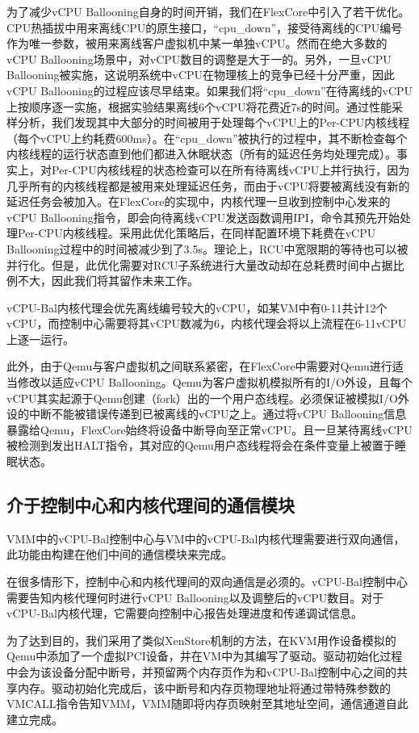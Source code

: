 为了减少vCPU Ballooning自身的时间开销，我们在FlexCore中引入了若干优化。CPU热插拔中用来离线CPU的原生接口，``cpu\_down''，接受待离线的CPU编号作为唯一参数，被用来离线客户虚拟机中某一单独vCPU。然而在绝大多数的vCPU Ballooning场景中，对vCPU数目的调整是大于一的。另外，一旦vCPU Ballooning被实施，这说明系统中vCPU在物理核上的竞争已经十分严重，因此vCPU Ballooning的过程应该尽早结束。如果我们将``cpu\_down''在待离线的vCPU上按顺序逐一实施，根据实验结果离线6个vCPU将花费近7s的时间。通过性能采样分析，我们发现其中大部分的时间被用于处理每个vCPU上的Per-CPU内核线程（每个vCPU上约耗费600ms）。在``cpu\_down''被执行的过程中，其不断检查每个内核线程的运行状态直到他们都进入休眠状态（所有的延迟任务均处理完成）。事实上，对Per-CPU内核线程的状态检查可以在所有待离线vCPU上并行执行，因为几乎所有的内核线程都是被用来处理延迟任务，而由于vCPU将要被离线没有新的延迟任务会被加入。在FlexCore的实现中，内核代理一旦收到控制中心发来的vCPU Ballooning指令，即会向待离线vCPU发送函数调用IPI，命令其预先开始处理Per-CPU内核线程。采用此优化策略后，在同样配置环境下耗费在vCPU Ballooning过程中的时间被减少到了3.5s。理论上，RCU中宽限期的等待也可以被并行化。但是，此优化需要对RCU子系统进行大量改动却在总耗费时间中占据比例不大，因此我们将其留作未来工作。

vCPU-Bal内核代理会优先离线编号较大的vCPU，如某VM中有0-11共计12个vCPU，而控制中心需要将其vCPU数减为6，内核代理会将以上流程在6-11vCPU上逐一运行。

此外，由于Qemu\cite{bellard2005qemu}与客户虚拟机之间联系紧密，在FlexCore中需要对Qemu进行适当修改以适应vCPU Ballooning。Qemu为客户虚拟机模拟所有的I/O外设，且每个vCPU其实起源于Qemu创建（fork）出的一个用户态线程。必须保证被模拟I/O外设的中断不能被错误传递到已被离线的vCPU之上。通过将vCPU Ballooning信息暴露给Qemu，FlexCore始终将设备中断导向至正常vCPU。且一旦某待离线vCPU被检测到发出HALT指令，其对应的Qemu用户态线程将会在条件变量上被置于睡眠状态。

\subsection{介于控制中心和内核代理间的通信模块}

VMM中的vCPU-Bal控制中心与VM中的vCPU-Bal内核代理需要进行双向通信，此功能由构建在他们中间的通信模块来完成。

在很多情形下，控制中心和内核代理间的双向通信是必须的。vCPU-Bal控制中心需要告知内核代理何时进行vCPU Ballooning以及调整后的vCPU数目。对于vCPU-Bal内核代理，它需要向控制中心报告处理进度和传递调试信息。

为了达到目的，我们采用了类似XenStore\cite{barham2003xen}机制的方法，在KVM用作设备模拟的Qemu中添加了一个虚拟PCI设备，并在VM中为其编写了驱动。驱动初始化过程中会为该设备分配中断号，并预留两个内存页作为和vCPU-Bal控制中心之间的共享内存。驱动初始化完成后，该中断号和内存页物理地址将通过带特殊参数的VMCALL\cite{guide2010intel}指令告知VMM，VMM随即将内存页映射至其地址空间，通信通道自此建立完成。

